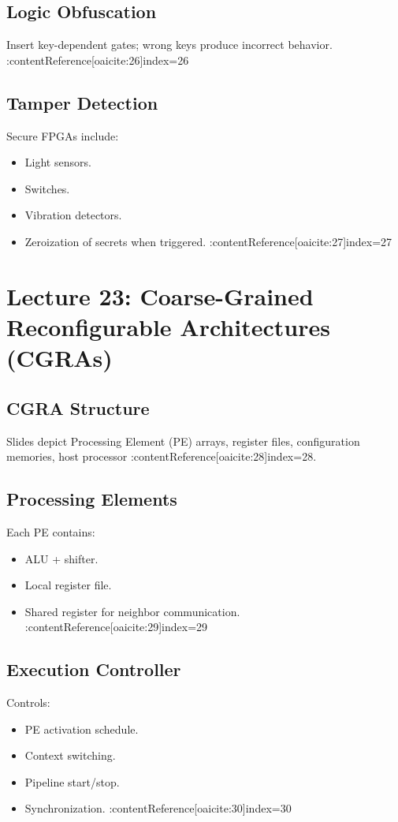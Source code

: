 \documentclass[11pt]{article}
\begin{document}
\subsection{Logic Obfuscation}
Insert key-dependent gates; wrong keys produce incorrect behavior. :contentReference[oaicite:26]{index=26}

\subsection{Tamper Detection}
Secure FPGAs include:
\begin{itemize}
    \item Light sensors.
    \item Switches.
    \item Vibration detectors.
    \item Zeroization of secrets when triggered. :contentReference[oaicite:27]{index=27}
\end{itemize}

\newpage

\section{Lecture 23: Coarse-Grained Reconfigurable Architectures (CGRAs)}

\subsection{CGRA Structure}
Slides depict Processing Element (PE) arrays, register files, configuration memories, host processor
:contentReference[oaicite:28]{index=28}.

\subsection{Processing Elements}
Each PE contains:
\begin{itemize}
    \item ALU + shifter.
    \item Local register file.
    \item Shared register for neighbor communication. :contentReference[oaicite:29]{index=29}
\end{itemize}

\subsection{Execution Controller}
Controls:
\begin{itemize}
    \item PE activation schedule.
    \item Context switching.
    \item Pipeline start/stop.
    \item Synchronization. :contentReference[oaicite:30]{index=30}
\end{itemize}
\end{document}
